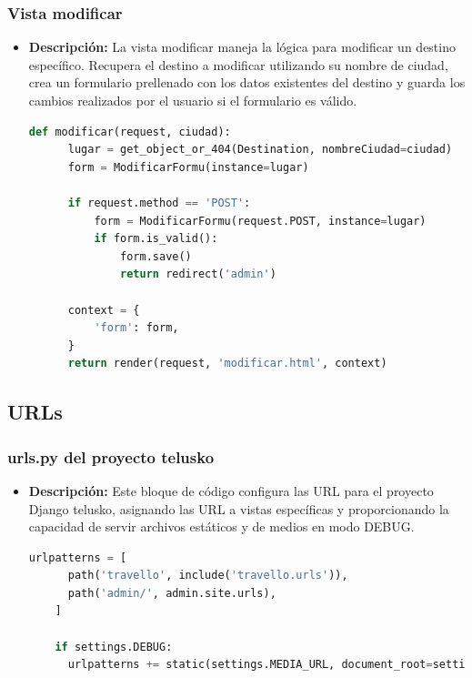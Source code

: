 \documentclass{article}
\begin{document}
  \subsubsection{Vista modificar}
  \begin{itemize}
    \item \textbf{Descripción: }La vista modificar maneja la lógica para modificar un destino específico. 
    Recupera el destino a modificar utilizando su nombre de ciudad, crea un formulario prellenado con los datos existentes 
    del destino y guarda los cambios realizados por el usuario si el formulario es válido.
    \begin{lstlisting}[language=Python, caption={modificar}]
    def modificar(request, ciudad):
      lugar = get_object_or_404(Destination, nombreCiudad=ciudad)
      form = ModificarFormu(instance=lugar)
      
      if request.method == 'POST':
          form = ModificarFormu(request.POST, instance=lugar)
          if form.is_valid():
              form.save()
              return redirect('admin')
      
      context = {
          'form': form,
      }
      return render(request, 'modificar.html', context)
    \end{lstlisting}
  \end{itemize}


  \subsection{URLs}
  

  \subsubsection{urls.py del proyecto telusko}
  \begin{itemize}
    \item \textbf{Descripción: }Este bloque de código configura las URL para el proyecto Django telusko, asignando las URL 
    a vistas específicas y proporcionando la capacidad de servir archivos estáticos y de medios en modo DEBUG.
    \begin{lstlisting}[language=Python, caption={urls Telusko}]
    urlpatterns = [
      path('travello', include('travello.urls')),  
      path('admin/', admin.site.urls),
    ]

    if settings.DEBUG:
      urlpatterns += static(settings.MEDIA_URL, document_root=settings.MEDIA_ROOT)
    \end{lstlisting}
  \end{itemize}
  
\end{document}
